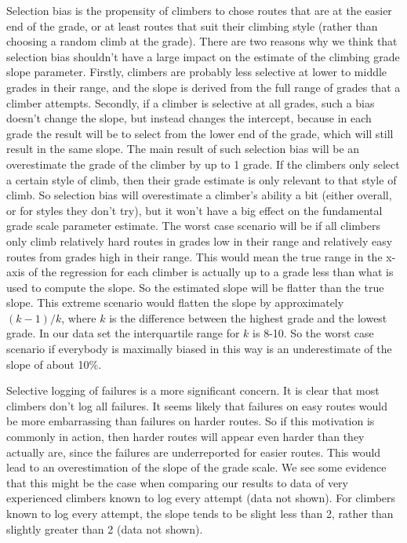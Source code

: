 \documentclass{article}
\begin{document}
{Selection bias is the propensity of climbers to chose routes that are at the easier end of the grade, or at least routes that suit their climbing style (rather than choosing a random climb at the grade). There are two reasons why we think that selection bias shouldn't have a large impact on the estimate of the climbing grade slope parameter. Firstly, climbers are probably less selective at lower to middle grades in their range, and the slope is derived from the full range of grades that a climber attempts. Secondly, if a climber is selective at all grades, such a bias doesn't change the slope, but instead changes the intercept, because in each grade the result will be to select from the lower end of the grade, which will still result in the same slope. The main result of such selection bias will be an overestimate the grade of the climber by up to 1 grade. If the climbers only select a certain style of climb, then their grade estimate is only relevant to that style of climb. So selection bias will overestimate a climber's ability a bit (either overall, or for styles they don't try), but it won't have a big effect on the fundamental grade scale parameter estimate. The worst case scenario will be if all climbers only climb relatively hard routes in grades low in their range and relatively easy routes from grades high in their range. This would mean the true range in the x-axis of the regression for each climber is actually up to a grade less than what is used to compute the slope. So the estimated slope will be flatter than the true slope. This extreme scenario would flatten the slope by approximately $(k-1)/k$, where $k$ is the difference between the highest grade and the lowest grade. In our data set the interquartile range for $k$ is 8-10. So the worst case scenario if everybody is maximally biased in this way is an underestimate of the slope of about 10\%.  

Selective logging of failures is a more significant concern. It is clear that most climbers don't log all failures. It seems likely that failures on easy routes would be more embarrassing than failures on harder routes. So if this motivation is commonly in action, then harder routes will appear even harder than they actually are, since the failures are underreported for easier routes. This would lead to an overestimation of the slope of the grade scale. We see some evidence that this might be the case when comparing our results to data of very experienced climbers known to log every attempt (data not shown). For climbers known to log every attempt, the slope tends to be slight less than 2, rather than slightly greater than 2 (data not shown).

}
\end{document}
